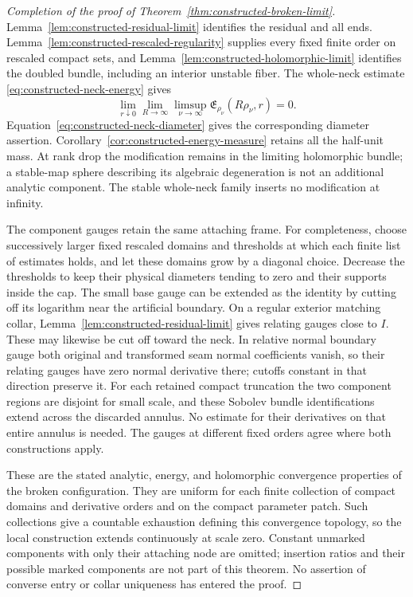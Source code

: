 \documentclass[11pt]{amsart}
\theoremstyle{definition}
\theoremstyle{remark}
\theoremstyle{plain}
\begin{document}
\begin{proof}[Completion of the proof of Theorem~\ref{thm:constructed-broken-limit}]
Lemma~\ref{lem:constructed-residual-limit} identifies the residual and
all ends. Lemma~\ref{lem:constructed-rescaled-regularity} supplies every
fixed finite order on rescaled compact sets, and
Lemma~\ref{lem:constructed-holomorphic-limit} identifies the doubled
bundle, including an interior unstable fiber. The whole-neck estimate
\eqref{eq:constructed-neck-energy} gives
\[
 \lim_{r\downarrow0}\lim_{R\to\infty}\limsup_{\nu\to\infty}
                  \mathfrak E_{\rho_\nu}(R\rho_\nu,r)=0.
\]
Equation~\eqref{eq:constructed-neck-diameter} gives the corresponding
diameter assertion. Corollary~\ref{cor:constructed-energy-measure}
retains all the half-unit mass. At rank drop the modification remains
in the limiting holomorphic bundle; a stable-map sphere describing its
algebraic degeneration is not an additional analytic component.
The stable whole-neck family inserts no modification at infinity.

The component gauges retain the same attaching frame. For completeness,
choose successively larger fixed rescaled domains and thresholds at
which each finite list of estimates holds, and let these domains grow
by a diagonal choice. Decrease the thresholds to keep their physical
diameters tending to zero and their supports inside the cap. The small
base gauge can be extended as the identity by cutting off its logarithm
near the artificial boundary. On a regular exterior matching collar,
Lemma~\ref{lem:constructed-residual-limit} gives relating gauges close
to $I$. These may likewise be cut off toward the neck. In relative
normal boundary gauge both original and transformed seam normal
coefficients vanish, so their relating gauges have zero normal
derivative there; cutoffs constant in that direction preserve it.
For each retained compact truncation the two component regions are
disjoint for small scale, and these Sobolev bundle identifications
extend across the discarded annulus. No estimate for their derivatives
on that entire annulus is needed. The gauges at different fixed orders
agree where both constructions apply.

These are the stated analytic, energy, and holomorphic convergence
properties of the broken configuration. They are uniform for each
finite collection of compact domains and derivative orders and on the
compact parameter patch. Such collections give a countable exhaustion
defining this convergence topology, so the local construction extends
continuously at scale zero. Constant unmarked components with only
their attaching node are omitted; insertion ratios and their possible
marked components are not part of this theorem. No assertion of
converse entry or collar uniqueness has entered the proof.
\end{proof}
\end{document}
